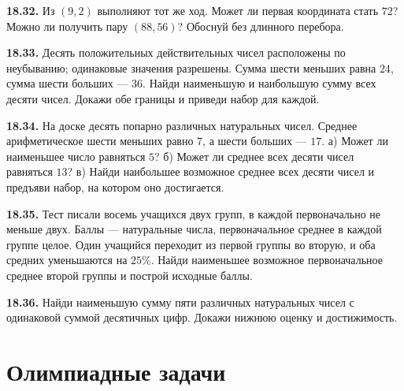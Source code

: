 \noindent\begin{minipage}[t]{\linewidth}\textbf{18.32.}\starmark{} Из \((9,2)\) выполняют тот же ход. Может ли первая координата стать \(72\)? Можно ли получить пару \((88,56)\)? Обоснуй без длинного перебора.\par\end{minipage}\par
\noindent\begin{minipage}[t]{\linewidth}\textbf{18.33.}\starmark{} Десять положительных действительных чисел расположены по неубыванию; одинаковые значения разрешены. Сумма шести меньших равна \(24\), сумма шести больших --- \(36\). Найди наименьшую и наибольшую сумму всех десяти чисел. Докажи обе границы и приведи набор для каждой.\par\end{minipage}\par
\noindent\begin{minipage}[t]{\linewidth}\textbf{18.34.}\starmark{} На доске десять попарно различных натуральных чисел. Среднее арифметическое шести меньших равно \(7\), а шести больших --- \(17\). а) Может ли наименьшее число равняться \(5\)? б) Может ли среднее всех десяти чисел равняться \(13\)? в) Найди наибольшее возможное среднее всех десяти чисел и предъяви набор, на котором оно достигается.\par\end{minipage}\par
\noindent\begin{minipage}[t]{\linewidth}\textbf{18.35.}\starmark{} Тест писали восемь учащихся двух групп, в каждой первоначально не меньше двух. Баллы --- натуральные числа, первоначальное среднее в каждой группе целое. Один учащийся переходит из первой группы во вторую, и оба средних уменьшаются на \(25\%\). Найди наименьшее возможное первоначальное среднее второй группы и построй исходные баллы.\par\end{minipage}\par
\noindent\begin{minipage}[t]{\linewidth}\textbf{18.36.}\starmark{} Найди наименьшую сумму пяти различных натуральных чисел с одинаковой суммой десятичных цифр. Докажи нижнюю оценку и достижимость.\par\end{minipage}\par
\par{}\section*{Олимпиадные задачи}
